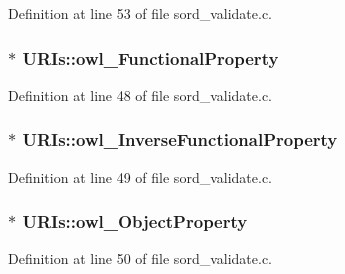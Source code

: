 Definition at line 53 of file sord\+\_\+validate.\+c.

\subsubsection[{\texorpdfstring{owl\+\_\+\+Functional\+Property}{owl_FunctionalProperty}}]{$\ast$ U\+R\+Is\+::owl\+\_\+\+Functional\+Property}\hypertarget{struct_u_r_is_ae0ea879336aed35b375edf552e1fa593}{}\label{struct_u_r_is_ae0ea879336aed35b375edf552e1fa593}


Definition at line 48 of file sord\+\_\+validate.\+c.

\subsubsection[{\texorpdfstring{owl\+\_\+\+Inverse\+Functional\+Property}{owl_InverseFunctionalProperty}}]{$\ast$ U\+R\+Is\+::owl\+\_\+\+Inverse\+Functional\+Property}\hypertarget{struct_u_r_is_a85a4d941c57e76ca42b1f4f5e6574b0c}{}\label{struct_u_r_is_a85a4d941c57e76ca42b1f4f5e6574b0c}


Definition at line 49 of file sord\+\_\+validate.\+c.

\subsubsection[{\texorpdfstring{owl\+\_\+\+Object\+Property}{owl_ObjectProperty}}]{$\ast$ U\+R\+Is\+::owl\+\_\+\+Object\+Property}\hypertarget{struct_u_r_is_a65ebce152bd968d0979552184e4444f1}{}\label{struct_u_r_is_a65ebce152bd968d0979552184e4444f1}


Definition at line 50 of file sord\+\_\+validate.\+c.

